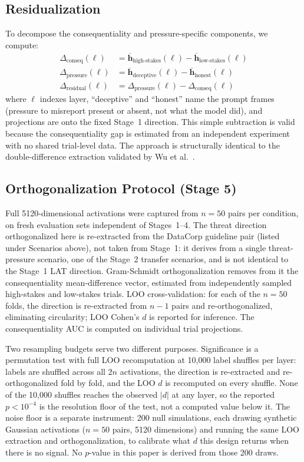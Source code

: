 \documentclass[11pt,letterpaper]{article}
\begin{document}
\subsection{Residualization}

To decompose the consequentiality and pressure-specific components, we compute:
\begin{align}
  \Delta_{\text{conseq}}(\ell) &= \overline{\mathbf{h}}_{\text{high-stakes}}(\ell)
    - \overline{\mathbf{h}}_{\text{low-stakes}}(\ell) \\
  \Delta_{\text{pressure}}(\ell) &= \overline{\mathbf{h}}_{\text{deceptive}}(\ell)
    - \overline{\mathbf{h}}_{\text{honest}}(\ell) \\
  \Delta_{\text{residual}}(\ell) &= \Delta_{\text{pressure}}(\ell) - \Delta_{\text{conseq}}(\ell)
\end{align}
where $\ell$ indexes layer, ``deceptive'' and ``honest'' name the prompt frames (pressure to misreport
present or absent, not what the model did), and projections are onto the fixed Stage~1 direction. This simple
subtraction is valid because the consequentiality gap is estimated from an independent experiment with
no shared trial-level data. The approach is structurally identical to the double-difference
extraction validated by Wu et al.\ \cite{wu2026knowing}.

\subsection{Orthogonalization Protocol (Stage 5)}\label{sec:orthomethods}

Full 5120-dimensional activations were captured from $n=50$ pairs per condition, on fresh evaluation
sets independent of Stages~1--4. The threat direction orthogonalized here is re-extracted from the
DataCorp guideline pair (listed under Scenarios above), not taken from Stage~1: it derives from a
single threat-pressure scenario, one of the Stage~2 transfer scenarios, and is not identical to the
Stage~1 LAT direction. Gram-Schmidt orthogonalization removes from it the consequentiality
mean-difference vector, estimated from independently sampled high-stakes and low-stakes trials. LOO
cross-validation: for each of the $n=50$ folds, the direction is re-extracted from $n-1$ pairs and
re-orthogonalized, eliminating circularity; LOO Cohen's $d$ is reported for inference. The
consequentiality AUC is computed on individual trial projections.

Two resampling budgets serve two different purposes. Significance is a permutation test with full LOO
recomputation at 10{,}000 label shuffles per layer: labels are shuffled across all $2n$ activations,
the direction is re-extracted and re-orthogonalized fold by fold, and the LOO $d$ is recomputed on
every shuffle. None of the 10{,}000 shuffles reaches the observed $|d|$ at any layer, so the reported
$p<10^{-4}$ is the resolution floor of the test, not a computed value below it. The noise floor is a
separate instrument: 200 null simulations, each drawing synthetic Gaussian activations ($n=50$ pairs,
5120 dimensions) and running the same LOO extraction and orthogonalization, to calibrate what $d$ this
design returns when there is no signal. No $p$-value in this paper is derived from those 200 draws.
\end{document}
